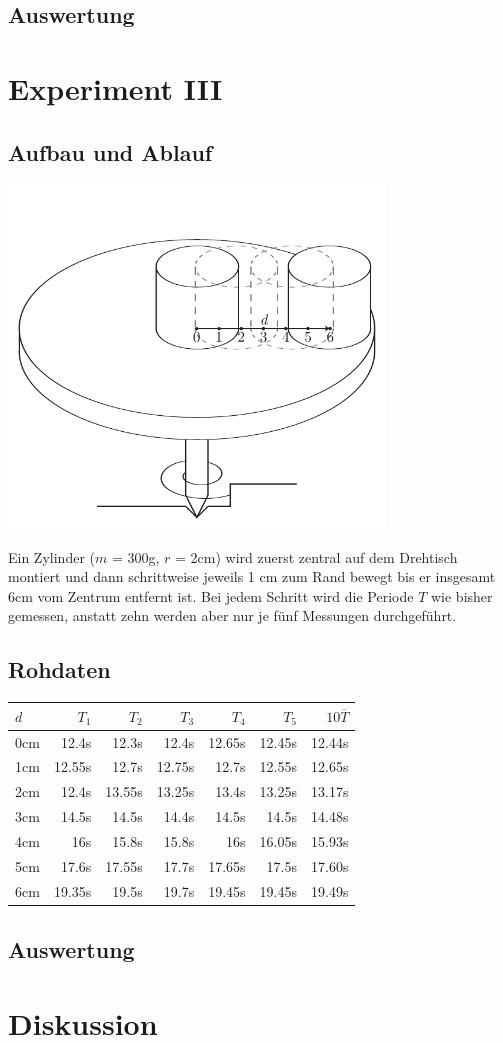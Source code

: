 \documentclass[12pt,a4paper]{article}
\begin{document}
\subsection*{Auswertung}


\section*{Experiment III}
\subsection*{Aufbau und Ablauf}

\begin{center}
\includegraphics[width=10cm]{illustration3.pdf}
\end{center}
Ein Zylinder ($m$ = 300g, $r$ = 2cm) wird zuerst zentral auf dem Drehtisch montiert und dann schrittweise jeweils 1 cm zum Rand bewegt bis er insgesamt 6cm vom Zentrum entfernt ist. Bei jedem Schritt wird die Periode $T$ wie bisher gemessen, anstatt zehn werden aber nur je f\"unf Messungen durchgef\"uhrt.

\subsection*{Rohdaten}
\begin{tabular}{|l|r|r|r|r|r|r|}
\hline
$d$&$T_1$&$T_2$&$T_3$&$T_4$&$T_5$&$10\overline{T}$\\
\hline
0cm&12.4s&12.3s&12.4s&12.65s&12.45s&12.44s\\
1cm&12.55s&12.7s&12.75s&12.7s&12.55s&12.65s\\
2cm&12.4s&13.55s&13.25s&13.4s&13.25s&13.17s\\
3cm&14.5s&14.5s&14.4s&14.5s&14.5s&14.48s\\
4cm&16s&15.8s&15.8s&16s&16.05s&15.93s\\
5cm&17.6s&17.55s&17.7s&17.65s&17.5s&17.60s\\
6cm&19.35s&19.5s&19.7s&19.45s&19.45s&19.49s\\
\hline
\end{tabular}

\subsection*{Auswertung}


\section*{Diskussion}
\end{document}
